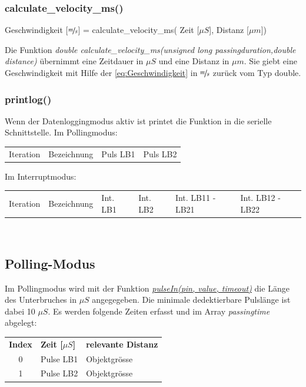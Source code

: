 \subsubsection{calculate\_velocity\_ms()}\label{subsubsec:calcvel}
\begin{center}
    Geschwindigkeit [$\nicefrac{m}{s}$] = calculate\_velocity\_ms( Zeit [$\mu S$], Distanz [$\mu m$])
\end{center}

Die Funktion \textit{double calculate\_velocity\_ms(unsigned long passingduration,double distance)} übernimmt eine Zeitdauer in $\mu S$ und eine Distanz in $\mu m$.
Sie giebt eine Geschwindigkeit mit Hilfe der \ref{eq:Geschwindigkeit} in $\nicefrac{m}{s}$ zurück vom Typ double.\\


\subsubsection{printlog()}
Wenn der Datenloggingmodus aktiv ist printet die Funktion in die serielle Schnittstelle.
Im Pollingmodus:\\
\begin{tabular}{llll}
    Iteration&Bezeichnung& Puls LB1 & Puls LB2\\
\end{tabular}

Im Interruptmodus:\\
\begin{tabular}{llllll}
    Iteration&Bezeichnung& Int. LB1 & Int. LB2& Int. LB11 - LB21& Int. LB12 - LB22\\
\end{tabular}\\

\clearpage
\subsection{Polling-Modus}\label{subsec:polling}
Im  Pollingmodus wird mit der Funktion \textit{\href{https://www.arduino.cc/reference/en/language/functions/advanced-io/pulsein/}{pulseIn(pin, value, timeout)}} die Länge des Unterbruches in $\mu S$ angegegeben. Die minimale dedektierbare Pulslänge ist dabei 10 $\mu S$.
Es werden folgende Zeiten erfasst und im Array \textit{passingtime} abgelegt:\\
\begin{tabular}{cll}
    \textbf{Index}&\textbf{Zeit [$\mu S$]} & \textbf{relevante Distanz} \\
    0&Pulse LB1 & Objektgrösse\\
    1&Pulse LB2 & Objektgrösse\\
\end{tabular}\\

